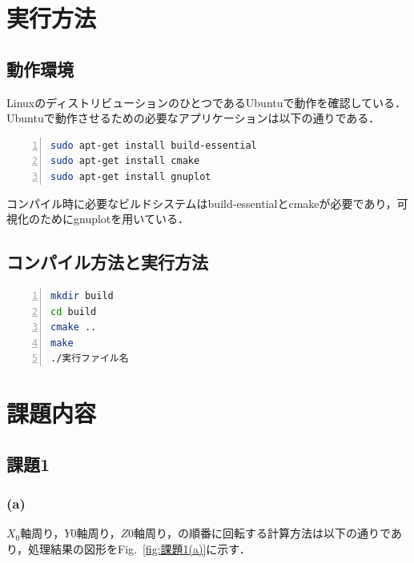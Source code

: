\documentclass[a4paper,10pt]{jsarticle}
\begin{document}
\section{実行方法}
\subsection{動作環境}
LinuxのディストリビューションのひとつであるUbuntuで動作を確認している．
Ubuntuで動作させるための必要なアプリケーションは以下の通りである．

\begin{lstlisting}[basicstyle=\ttfamily\footnotesize, language=Bash, frame=single, firstnumber=1, numbers=left, breaklines=true]
sudo apt-get install build-essential
sudo apt-get install cmake
sudo apt-get install gnuplot
\end{lstlisting}

コンパイル時に必要なビルドシステムはbuild-essentialとcmakeが必要であり，可視化のためにgnuplotを用いている．

\subsection{コンパイル方法と実行方法}

\begin{lstlisting}[basicstyle=\ttfamily\footnotesize, language=Bash, frame=single, firstnumber=1, numbers=left, breaklines=true]
mkdir build
cd build
cmake ..
make
./実行ファイル名
\end{lstlisting}

\section{課題内容}
\subsection{課題1}
\subsubsection{(a)}
$X_0$軸周り，$Y0$軸周り，$Z0$軸周り，の順番に回転する計算方法は以下の通りであり，処理結果の図形をFig.~\ref{fig:課題1(a)}に示す．
\end{document}
